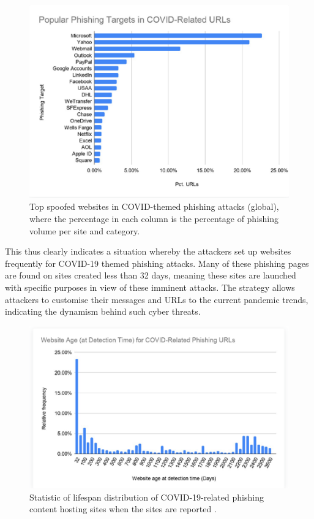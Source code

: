 \captionsetup{font= footnotesize}
\begin{figure}[H]
    \centering
    \includegraphics[width=0.8\linewidth]{background/TOPCOVIDURLS.png}
    \caption{Top spoofed websites in COVID-themed phishing attacks (global), where the percentage in each column is the percentage of phishing volume per site and category. }
    \label{fig:figFiveteen}
\end{figure}

This thus clearly indicates a situation whereby the attackers set up websites frequently for COVID-19 themed phishing attacks. Many of these phishing pages are found on sites created less than 32 days, meaning these sites are launched with specific purposes in view of these imminent attacks. The strategy allows attackers to customise their messages and URLs to the current pandemic trends, indicating the dynamism behind such cyber threats.

\captionsetup{font= footnotesize}
\begin{figure}[H]
    \centering
    \includegraphics[width=0.8\linewidth]{background/AgeCovid.png}
    \caption{Statistic of lifespan distribution of COVID-19-related phishing content hosting sites when the sites are reported .}
    \label{fig:figSixteen}
\end{figure}


